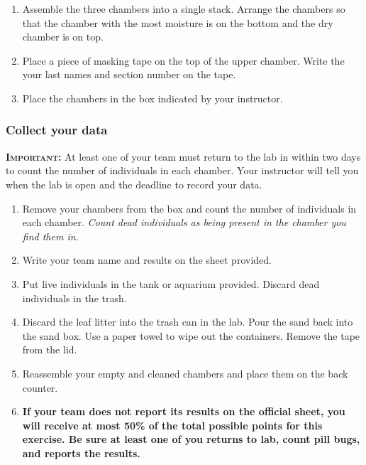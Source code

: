 \documentclass[12pt, hidelinks]{exam}
\begin{document}
\begin{questions}
\begin{enumerate}
	\item Assemble the three chambers into a single stack. Arrange the chambers so that the chamber with the most moisture is on the bottom and the dry chamber is on top. 
	
	\item Place a piece of masking tape on the top of the upper chamber. Write the your last names and section number on the tape.
	
	\item Place the chambers in the box indicated by your instructor.
	
\end{enumerate}

\subsubsection*{Collect your data}


{\scshape \textbf{Important:}} At least one of your team must return to the lab in within two days to count the number of individuals in each chamber. Your instructor will tell you when the lab is open and the deadline to record your data. 

\begin{enumerate}
	\item Remove your chambers from the box and count the number of individuals in each chamber. \emph{Count dead individuals as being present in the chamber you find them in.}
	
	\item Write your team name and results on the sheet provided.
	
	\item Put live individuals in the tank or aquarium provided. Discard dead individuals in the trash.
	
	\item Discard the leaf litter into the trash can in the lab. Pour the sand back into the sand box. Use a paper towel to wipe out the containers. Remove the tape from the lid.
	
	\item Reassemble your empty and cleaned chambers and place them on the back counter. 
	
	\item \textbf{If your team does not report its results on the official sheet, you will receive at most 50\% of the total possible points for this exercise. Be sure at least one of you returns to lab, count pill bugs, and reports the results.}
		

\end{enumerate}
\end{questions}
\end{document}
